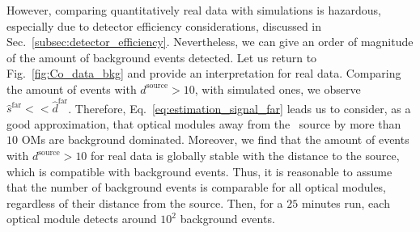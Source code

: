 However, comparing quantitatively real data with simulations is hazardous, especially due to detector efficiency considerations, discussed in Sec.~\ref{subsec:detector_efficiency}.
Nevertheless, we can give an order of magnitude of the amount of background events detected.
Let us return to Fig.~\ref{fig:Co_data_bkg} and provide an interpretation for real data.
Comparing the amount of events with $d^{\text{source}}>10$, with simulated ones, we observe $\hat{s}^{\text{far}}<<\hat{d}^{\text{far}}$.
Therefore, Eq.~\eqref{eq:estimation_signal_far} leads us to consider, as a good approximation, that optical modules away from the \Co\ source by more than $10$ OMs are background dominated.
Moreover, we find that the amount of events with $d^{\text{source}}>10$ for real data is globally stable with the distance to the source, which is compatible with background events.
Thus, it is reasonable to assume that the number of background events is comparable for all optical modules, regardless of their distance from the source.
Then, for a $25$ minutes run, each optical module detects around $10^{2}$ background events.

